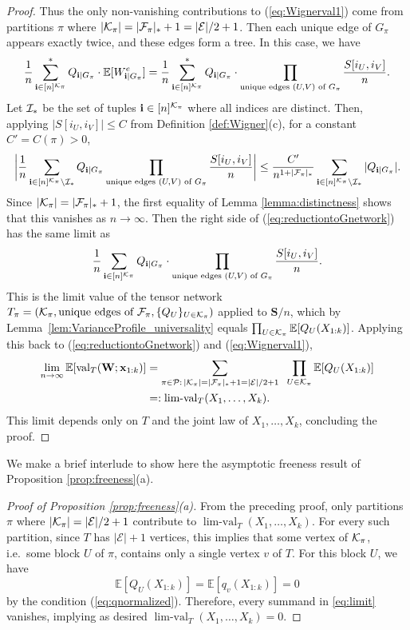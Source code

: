 \documentclass[10pt,reqno]{amsart}
\def\x{\mathbf{x}}
\def\W{\mathbf{W}}
\def\S{\mathbf{S}}
\def\E{\mathbb{E}}
\def\cE{\mathcal{E}}
\def\val{\operatorname{val}}
\def\limval{\operatorname{lim-val}}
\def\bi{\mathbf{i}}
\begin{document}
\begin{proof}
Thus the only non-vanishing contributions to (\ref{eq:Wignerval1})
come from partitions $\pi$
where $|\cK_\pi|=|\cF_\pi|_*+1=|\cE|/2+1$.
Then each unique edge of $G_\pi$ appears exactly twice, and these edges
form a tree. In this case, we have
\begin{equation}\label{eq:reductiontoGnetwork}
\frac{1}{n}\sum_{\bi \in [n]^{\cK_\pi}}^* Q_{\bi|G_\pi}
\cdot \E[W_{\bi|G_\pi}^e]
=\frac{1}{n}\sum_{\bi \in [n]^{\cK_\pi}}^* 
Q_{\bi|G_\pi} \cdot \prod_{\text{unique edges } (U,V)\text{ of } G_\pi}
\frac{S[i_U,i_V]}{n}.
\end{equation}
Let $\mathcal{I}_*$ be the set of tuples $\bi \in [n]^{\cK_\pi}$
where all indices are distinct. Then, applying $|S[i_U,i_V]| \leq C$ from
Definition \ref{def:Wigner}(c), for a constant $C'=C(\pi)>0$,
\[\bigg|\frac{1}{n} \sum_{\ib \in [n]^{\cK_\pi} \setminus \cI_*}
Q_{\bi|G_\pi} \prod_{\text{unique edges } (U,V) \text{ of } G_\pi} 
\frac{S[i_U,i_V]}{n}\bigg|
\leq \frac{C'}{n^{1+|\cF_\pi|_*}} 
\sum_{\ib \in [n]^{\cK_\pi} \setminus \cI_*} |Q_{\bi|G_\pi}|.\]
Since $|\mathcal{K}_\pi|=|\mathcal{F}_\pi|_*+1$, the first equality of
Lemma \ref{lemma:distinctness} shows
that this vanishes as $n \to \infty$. Then the right side of
(\ref{eq:reductiontoGnetwork}) has the same limit as
\[\frac{1}{n}\sum_{\bi \in [n]^{\cK_\pi}}
Q_{\bi|G_\pi} \cdot \prod_{\text{unique edges } (U,V)\text{ of } G_\pi}
\frac{S[i_U,i_V]}{n}.\]
This is the limit value of the
tensor network $T_\pi=(\mathcal{K}_\pi,\text{unique edges of
}\mathcal{F}_\pi,\{Q_U\}_{U \in \mathcal{K}_\pi})$ applied to $\S/n$, which by
Lemma~\ref{lem:VarianceProfile_universality} equals
$\prod_{U \in \cK_\pi} \E[Q_U(X_{1:k})]$. Applying this back to
(\ref{eq:reductiontoGnetwork}) and (\ref{eq:Wignerval1}),
\begin{align}
\lim_{n \to \infty} \E[\val_T(\W;\x_{1:k})]
&=\sum_{\pi \in \cP:\,|\cK_\pi|=|\cF_\pi|_*+1=|\cE|/2+1}\;\;
\prod_{U \in \cK_\pi} \E[Q_U(X_{1:k})]\label{eq:limit}\\
&=:\limval_T(X_1,\ldots,X_k).\notag
\end{align}
This limit depends only
on $T$ and the joint law of $X_1,\ldots,X_k$, concluding the proof.
\end{proof}

We make a brief interlude to show here the asymptotic freeness result of 
Proposition \ref{prop:freeness}(a).

\begin{proof}[Proof of Proposition \ref{prop:freeness}(a)]
From the preceding proof, only partitions $\pi$ where
$|\cK_\pi|=|\cE|/2+1$ contribute to $\limval_T(X_1,\ldots,X_k)$.
For every such partition, since $T$ has $|\cE|+1$ vertices, this implies that
some vertex of $\mathcal{K}_\pi$, i.e.\ some block $U$ of $\pi$,
contains only a single vertex $v$ of $T$. For this block $U$, we have
\[\E[Q_U(X_{1:k})]=\E[q_v(X_{1:k})]=0\]
by the condition (\ref{eq:qnormalized}). 
Therefore, every summand in \eqref{eq:limit} vanishes, implying
as desired $\limval_T(X_1,\ldots,X_k)=0$.
\end{proof}
\end{document}
